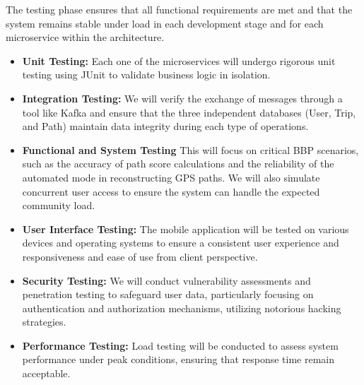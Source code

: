 The testing phase ensures that all functional requirements are met and that the system remains stable under load in each development stage and for each microservice within the architecture.

\begin{itemize}
   \item \textbf{Unit Testing:} Each one of the microservices will undergo rigorous unit testing using JUnit to validate business logic in isolation.
   \item \textbf{Integration Testing:} We will verify the exchange of messages through a tool like Kafka and ensure that the three independent databases (User, Trip, and Path) maintain data integrity during each type of operations.
   \item \textbf{Functional and System Testing} This will focus on critical BBP scenarios, such as the accuracy of path score calculations and the reliability of the automated mode in reconstructing GPS paths. \newline We will also simulate concurrent user access to ensure the system can handle the expected community load.
   \item \textbf{User Interface Testing:} The mobile application will be tested on various devices and operating systems to ensure a consistent user experience and responsiveness and ease of use from client perspective.
   \item \textbf{Security Testing:} We will conduct vulnerability assessments and penetration testing to safeguard user data, particularly focusing on authentication and authorization mechanisms, utilizing notorious hacking strategies.
   \item \textbf{Performance Testing:} Load testing will be conducted to assess system performance under peak conditions, ensuring that response time remain acceptable.
\end{itemize}

